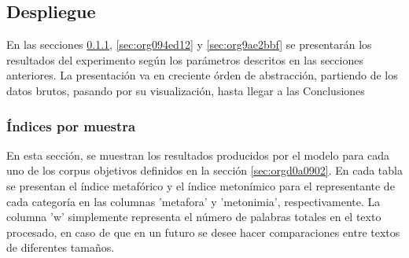 \documentclass[12pt,letterpaper,twoside]{article}
\begin{document}
\subsection{Despliegue}
\label{sec:orge6ef32d}
En las secciones \ref{sec:orga8e5199}, \ref{sec:org094ed12} y
\ref{sec:org9ae2bbf} se presentarán los resultados del experimento
según los parámetros descritos en las secciones anteriores.
La presentación va en creciente órden de abstracción, partiendo
de los datos brutos, pasando por su visualización, hasta llegar
a las Conclusiones 

\subsubsection{Índices por muestra}
\label{sec:orga8e5199}
En esta sección, se muestran los resultados producidos por el modelo
para cada uno de los corpus objetivos definidos en la sección
\ref{sec:orgd0a0902}. En cada tabla se presentan el índice
metafórico y el índice metonímico para el representante de cada
categoría en las columnas 'metafora' y 'metonimia',
respectivamente. La columna 'w' simplemente representa el número de
palabras totales en el texto procesado, en caso de que en un futuro se
desee hacer comparaciones entre textos de diferentes tamaños.
\end{document}
